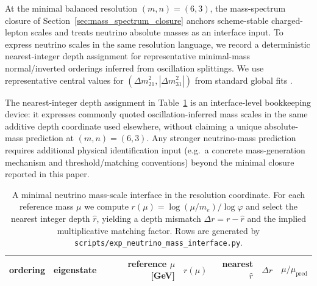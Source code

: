 At the minimal balanced resolution $(m,n)=(6,3)$, the mass-spectrum closure of Section~\ref{sec:mass_spectrum_closure} anchors scheme-stable charged-lepton scales and treats neutrino absolute masses as an interface input.
To express neutrino scales in the same resolution language, we record a deterministic nearest-integer depth assignment for representative minimal-mass normal/inverted orderings inferred from oscillation splittings.
We use representative central values for $(\Delta m_{21}^2,|\Delta m_{31}^2|)$ from standard global fits \cite{PDGRPP2024,Esteban2020NuFIT}.
\begin{remark}\label{rem:neutrino_scale_status}
The nearest-integer depth assignment in Table~\ref{tab:neutrino_mass_interface} is an interface-level bookkeeping device: it expresses commonly quoted oscillation-inferred mass scales in the same additive depth coordinate used elsewhere, without claiming a unique absolute-mass prediction at $(m,n)=(6,3)$.
Any stronger neutrino-mass prediction requires additional physical identification input (e.g.\ a concrete mass-generation mechanism and threshold/matching conventions) beyond the minimal closure reported in this paper.
\end{remark}

\begin{table}[t]
\centering
\small
\setlength{\tabcolsep}{6pt}
\renewcommand{\arraystretch}{1.15}
\begin{tabular}{llrrrrr}
\toprule
ordering & eigenstate & reference $\mu$ [GeV] & $r(\mu)$ & nearest $\widehat r$ & $\Delta r$ & $\mu/\mu_{\mathrm{pred}}$ \\
\midrule
%
\end{tabular}
\caption{A minimal neutrino mass-scale interface in the resolution coordinate. For each reference mass $\mu$ we compute $r(\mu)=\log(\mu/m_e)/\log\varphi$ and select the nearest integer depth $\widehat r$, yielding a depth mismatch $\Delta r=r-\widehat r$ and the implied multiplicative matching factor. Rows are generated by \texttt{scripts/exp\_neutrino\_mass\_interface.py}.}
\label{tab:neutrino_mass_interface}
\end{table}


